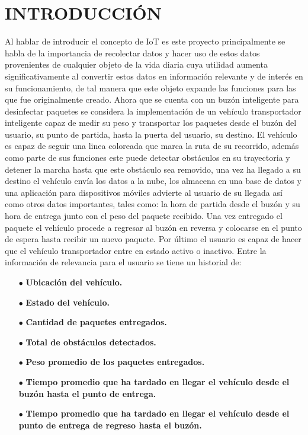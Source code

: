 \documentclass[osajnl,twocolumn,showpacs,superscriptaddress,10pt]{revtex4-1}
\begin{document}
\section{INTRODUCCIÓN}
Al hablar de introducir el concepto de IoT es este proyecto principalmente se habla de la importancia de recolectar datos y hacer uso de estos datos provenientes de cualquier objeto de la vida diaria cuya utilidad aumenta significativamente al convertir estos datos en información relevante y de interés en su funcionamiento, de tal manera que este objeto expande las funciones para las que fue originalmente creado. Ahora que se cuenta con un buzón inteligente para desinfectar paquetes se considera la implementación de un vehículo transportador inteligente capaz de medir su peso y transportar los paquetes desde el buzón del usuario, su punto de partida, hasta la puerta del usuario, su destino. El vehículo es capaz de seguir una linea coloreada que marca la ruta de su recorrido, además como parte de sus funciones este puede detectar obstáculos en su trayectoria y detener la marcha hasta que este obstáculo sea removido, una vez ha llegado a su destino el vehículo envía los datos a la nube, los almacena en una base de datos y una aplicación para dispositivos móviles advierte al usuario de su llegada así como otros datos importantes, tales como: la hora de partida desde el buzón y su hora de entrega junto con el peso del paquete recibido. Una vez entregado el paquete el vehículo procede a regresar al buzón en reversa y colocarse en el punto de espera hasta recibir un nuevo paquete. Por último el usuario es capaz de hacer que el vehículo transportador entre en estado activo o inactivo. Entre la información de relevancia para el usuario se tiene un historial de:
\begin{itemize}
    \item[$\bullet$]\textbf{Ubicación del vehículo.}
    \item[$\bullet$]\textbf{Estado del vehículo.}
    \item[$\bullet$]\textbf{Cantidad de paquetes entregados.}
    \item[$\bullet$]\textbf{Total de obstáculos detectados.}
    \item[$\bullet$]\textbf{Peso promedio de los paquetes entregados.}
    \item[$\bullet$]\textbf{Tiempo promedio que ha tardado en llegar el vehículo desde el buzón hasta el punto de entrega.}
    \item[$\bullet$]\textbf{Tiempo promedio que ha tardado en llegar el vehículo desde el punto de entrega de regreso hasta el buzón.}
    
\end{itemize}
\end{document}
